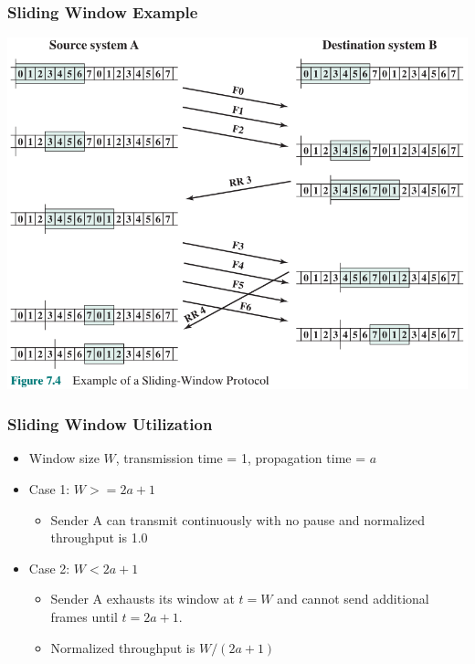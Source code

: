\documentclass[pdflatex,compress]{beamer}
\begin{document}
\begin{frame}
	\frametitle{Sliding Window Example}
	\begin{center}
		\includegraphics[width=0.8\linewidth]{img/img04}
	\end{center}
\end{frame}

\begin{frame}
	\frametitle{Sliding Window Utilization}
	\begin{itemize}
		\item Window size $ W $, transmission time = 1, propagation time = $ a $
		\item Case 1: $ W >= 2a + 1 $
		\begin{itemize}
			\item Sender A can transmit continuously with no pause and normalized throughput is 1.0
		\end{itemize}
		\item Case 2: $ W < 2a + 1 $
		\begin{itemize}
			\item Sender A exhausts its window at $ t = W $ and cannot send additional frames until $ t = 2a + 1 $.
			\item Normalized throughput is $ W/(2a+1) $
		\end{itemize}
	\end{itemize}
\end{frame}
\end{document}
